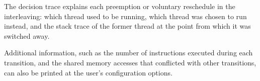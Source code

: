 The decision trace explains each preemption or voluntary reschedule in the interleaving: which thread used to be running, which thread was chosen to run instead, and the stack trace of the former thread at the point from which it was switched away.


Additional information, such as the number of instructions executed during each transition, and the shared memory accesses that conflicted with other transitions, can also be printed at the user's configuration options.


